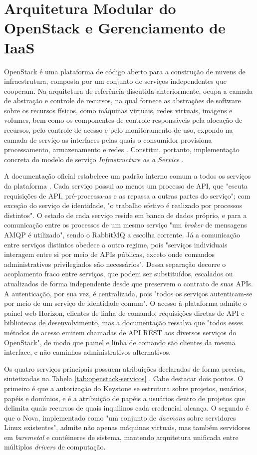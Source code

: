 
\section{Arquitetura Modular do OpenStack e Gerenciamento de IaaS}

OpenStack é uma plataforma de código aberto para a construção de nuvens de infraestrutura, composta por um conjunto de serviços independentes que cooperam. Na arquitetura de referência discutida anteriormente, ocupa a camada de abstração e controle de recursos, na qual fornece as abstrações de software sobre os recursos físicos, como máquinas virtuais, redes virtuais, imagens e volumes, bem como os componentes de controle responsáveis pela alocação de recursos, pelo controle de acesso e pelo monitoramento de uso, expondo na camada de serviço as interfaces pelas quais o consumidor provisiona processamento, armazenamento e redes \cite{liu2011nist}. Constitui, portanto, implementação concreta do modelo de serviço \emph{Infrastructure as a Service} \cite{mell2011nist}.

A documentação oficial estabelece um padrão interno comum a todos os serviços da plataforma \cite{openstackdocs2026}. Cada serviço possui ao menos um processo de API, que "escuta requisições de API, pré-processa-as e as repassa a outras partes do serviço"; com exceção do serviço de identidade, "o trabalho efetivo é realizado por processos distintos". O estado de cada serviço reside em banco de dados próprio, e para a comunicação entre os processos de um mesmo serviço "um \emph{broker} de mensagens AMQP é utilizado", sendo o RabbitMQ a escolha corrente. Já a comunicação entre serviços distintos obedece a outro regime, pois "serviços individuais interagem entre si por meio de APIs públicas, exceto onde comandos administrativos privilegiados são necessários". Dessa separação decorre o acoplamento fraco entre serviços, que podem ser substituídos, escalados ou atualizados de forma independente desde que preservem o contrato de suas APIs. A autenticação, por sua vez, é centralizada, pois "todos os serviços autenticam-se por meio de um serviço de identidade comum". O acesso à plataforma admite o painel web Horizon, clientes de linha de comando, requisições diretas de API e bibliotecas de desenvolvimento, mas a documentação ressalva que "todos esses métodos de acesso emitem chamadas de API REST aos diversos serviços do OpenStack", de modo que painel e linha de comando são clientes da mesma interface, e não caminhos administrativos alternativos.

Os quatro serviços principais possuem atribuições declaradas de forma precisa, sintetizadas na Tabela \ref{tab:openstack-servicos} \cite{openstackdocs2026}. Cabe destacar dois pontos. O primeiro é que a autorização do Keystone se estrutura sobre projetos, usuários, papéis e domínios, e é a atribuição de papéis a usuários dentro de projetos que delimita quais recursos de quais inquilinos cada credencial alcança. O segundo é que o Nova, implementado como "um conjunto de \emph{daemons} sobre servidores Linux existentes", admite não apenas máquinas virtuais, mas também servidores em \emph{baremetal} e contêineres de sistema, mantendo arquitetura unificada entre múltiplos \emph{drivers} de computação.

